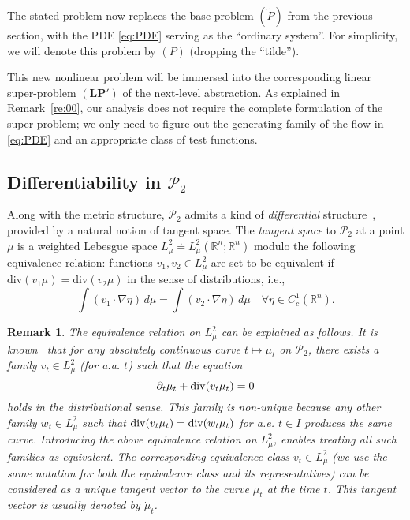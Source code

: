 \documentclass[sn-mathphys-num]{sn-jnl}
\numberwithin{equation}{section}
\theoremstyle{mythm}
\theoremstyle{mydef}
\newtheorem{remark}[proposition]{Remark}
\renewcommand{\d}{\,d}
\renewcommand{\div}{\mathop{\rm div}}
\begin{document}
The stated problem now replaces the base problem \( (\widetilde{P}) \) from the previous section, with the PDE \eqref{eq:PDE} serving as the ``ordinary system''. For simplicity, we will denote this problem by \( (P) \) (dropping the ``tilde''). 

This new nonlinear problem will be immersed into the corresponding linear super-problem $(\bm{LP}')$ of the next-level abstraction. As explained in Remark~\ref{re:00}, our analysis does not require the complete formulation of the super-problem; we only need to figure out the generating family of the flow in \eqref{eq:PDE} and an appropriate class of test functions.


\subsection{Differentiability in $\mathcal P_2$}\label{ssec:dif-W}

Along with the metric structure, \( \mathcal{P}_2 \) admits a kind  of \emph{differential} structure~\cite{ottoGeometryDissipativeEvolution2001,ambrosioGradientFlowsMetric2005}, provided by a natural notion of tangent space. 
The \emph{tangent space} to \( \mathcal{P}_2 \) at a point \( \mu \) is a weighted Lebesgue space \( {L}^2_{\mu} \doteq {L}^2_{\mu}(\mathbb{R}^n;\mathbb{R}^n) \) modulo the following equivalence relation: functions \( v_1,v_2 \in {L}^2_{\mu} \) are set to be  equivalent if \( \mathrm{div}(v_1\mu) = \mathrm{div}(v_2\mu) \) in the sense of distributions, i.e.,
\[
\int (v_1 \cdot \nabla\eta) \d \mu =
\int (v_2 \cdot \nabla\eta) \d \mu \quad \forall \eta \in C^1_c(\mathbb{R}^n).
\]

\begin{remark}
  The equivalence relation on \( L^2_{\mu} \) can be explained as follows. 
  It is known~\cite{ambrosioGradientFlowsMetric2005} that for any absolutely continuous curve \( t \mapsto \mu_t \) on \( \mathcal{P}_2 \), there exists a family \( v_t \in L^2_{\mu} \) (for a.a. \( t \)) such that the equation
  \[
    \partial_t \mu_t + \div(v_t \mu_t) = 0
  \]
  holds in the distributional sense. 
  This family is non-unique because any other family \( w_t \in L^2_{\mu} \) such that \( \div(v_t \mu_t) = \div(w_t \mu_t) \) for a.e. \( t \in{I}\) produces the same curve.
  Introducing the above equivalence relation on \( L^2_{\mu} \), enables treating all such families as equivalent. 
  The corresponding equivalence class \( v_t \in L^2_{\mu} \) (we use the same notation for both the equivalence class and its representatives) can be considered as a unique tangent vector to the curve \( \mu_t \) at the time \( t \). 
  This tangent vector is usually denoted by \( \dot\mu_t \).
\end{remark}
\end{document}
